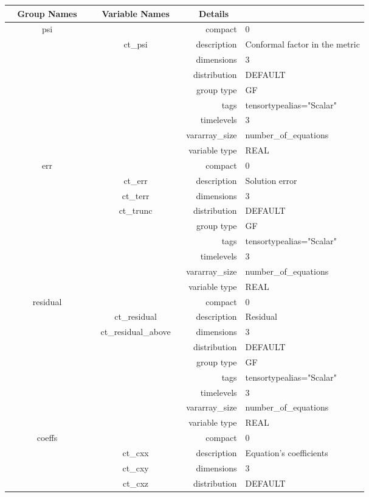 \begin{tabular*}{150mm}{|c|c@{\extracolsep{\fill}}|rl|} \hline 
~ {\bf Group Names} ~ & ~ {\bf Variable Names} ~  &{\bf Details} ~ & ~\\ 
\hline 
psi &  & compact & 0 \\ 
 & ct\_psi & description & Conformal factor in the metric \\ 
 &  & dimensions & 3 \\ 
 &  & distribution & DEFAULT \\ 
 &  & group type & GF \\ 
 &  & tags & tensortypealias="Scalar" \\ 
 &  & timelevels & 3 \\ 
 &  & vararray\_size & number\_of\_equations \\ 
 &  & variable type & REAL \\ 
\hline 
err &  & compact & 0 \\ 
 & ct\_err & description & Solution error \\ 
 & ct\_terr & dimensions & 3 \\ 
 & ct\_trunc & distribution & DEFAULT \\ 
 &  & group type & GF \\ 
 &  & tags & tensortypealias="Scalar" \\ 
 &  & timelevels & 3 \\ 
 &  & vararray\_size & number\_of\_equations \\ 
 &  & variable type & REAL \\ 
\hline 
residual &  & compact & 0 \\ 
 & ct\_residual & description & Residual \\ 
 & ct\_residual\_above & dimensions & 3 \\ 
 &  & distribution & DEFAULT \\ 
 &  & group type & GF \\ 
 &  & tags & tensortypealias="Scalar" \\ 
 &  & timelevels & 3 \\ 
 &  & vararray\_size & number\_of\_equations \\ 
 &  & variable type & REAL \\ 
\hline 
coeffs &  & compact & 0 \\ 
 & ct\_cxx & description & Equation's coefficients \\ 
 & ct\_cxy & dimensions & 3 \\ 
 & ct\_cxz & distribution & DEFAULT \\ 

\end{tabular*}

